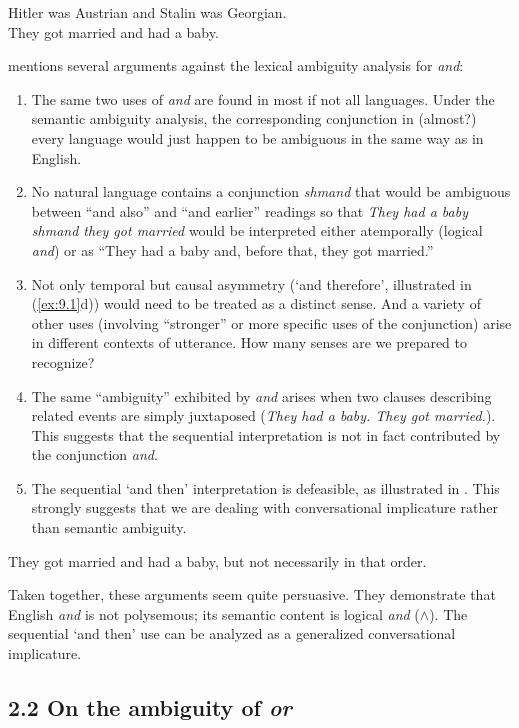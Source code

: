 \ea \label{ex:9.8}
\ea Hitler was Austrian and Stalin was Georgian.\\
\ex They got married and had a baby.
                       \z
\z


\citet{Horn2004} mentions several arguments against the lexical ambiguity analysis for \textit{and}:


\begin{enumerate}[label=\roman*.]
\item The same two uses of \textit{and} are found in most if not all languages. Under the semantic ambiguity analysis, the corresponding conjunction in (almost?) every language would just happen to be ambiguous in the same way as in English.
\item No natural language contains a conjunction \textit{shmand} that would be ambiguous between “and also” and “and earlier” readings so that \textit{They had a baby shmand they got married} would be interpreted either atemporally (logical \textit{and}) or as “They had a baby and, before that, they got married.”
\item Not only temporal but causal asymmetry (‘and therefore’, illustrated in (\ref{ex:9.1}d)) would need to be treated as a distinct sense. And a variety of other uses (involving “stronger” or more specific uses of the conjunction) arise in different contexts of utterance. How many senses are we prepared to recognize?
\item The same “ambiguity” exhibited by \textit{and} arises when two clauses describing related events are simply juxtaposed (\textit{They had a baby. They got married.}). This suggests that the sequential interpretation is not in fact contributed by the conjunction \textit{and}.
\item The sequential ‘and then’ interpretation is defeasible, as illustrated in . This strongly suggests that we are dealing with conversational implicature rather than semantic ambiguity.
\end{enumerate}

\ea \label{ex:9.9}
They got married and had a baby, but not necessarily in that order.
\z


Taken together, these arguments seem quite persuasive. They demonstrate that English \textit{and} is not polysemous; its semantic content is logical \textit{and} ($\wedge$). The sequential ‘and then’ use can be analyzed as a generalized conversational implicature.


\subsection{2.2 On the ambiguity of \textit{or}}\label{sec:}


